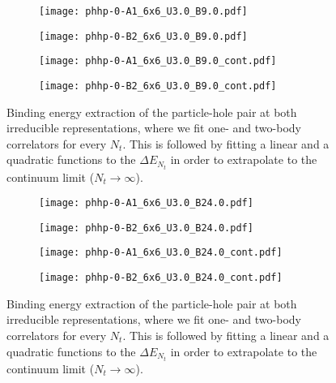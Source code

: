 \begin{figure}
  \begin{subfigure}{.5\textwidth}
    \centering
    \texttt{[image: phhp-0-A1\_6x6\_U3.0\_B9.0.pdf]}
  \end{subfigure}%
  \begin{subfigure}{.5\textwidth}
    \centering
    \texttt{[image: phhp-0-B2\_6x6\_U3.0\_B9.0.pdf]}
  \end{subfigure}
  \begin{subfigure}{.5\textwidth}
      \centering
      \texttt{[image: phhp-0-A1\_6x6\_U3.0\_B9.0\_cont.pdf]}
  \end{subfigure}
  \begin{subfigure}{.5\textwidth}
      \centering
      \texttt{[image: phhp-0-B2\_6x6\_U3.0\_B9.0\_cont.pdf]}
  \end{subfigure}
  \caption{Binding energy extraction of the particle-hole pair at both irreducible representations, where we fit one- and two-body correlators for every $N_t$. This is followed by fitting a linear and a quadratic functions to the $\Delta E_{N_t}$ in order to extrapolate to the continuum limit ($N_t\to\infty$).}
  \label{fig:fig11}
\end{figure}

\begin{figure}
  \begin{subfigure}{.5\textwidth}
    \centering
    \texttt{[image: phhp-0-A1\_6x6\_U3.0\_B24.0.pdf]}
  \end{subfigure}%
  \begin{subfigure}{.5\textwidth}
    \centering
    \texttt{[image: phhp-0-B2\_6x6\_U3.0\_B24.0.pdf]}
  \end{subfigure}
  \begin{subfigure}{.5\textwidth}
      \centering
      \texttt{[image: phhp-0-A1\_6x6\_U3.0\_B24.0\_cont.pdf]}
  \end{subfigure}
  \begin{subfigure}{.5\textwidth}
      \centering
      \texttt{[image: phhp-0-B2\_6x6\_U3.0\_B24.0\_cont.pdf]}
  \end{subfigure}
  \caption{Binding energy extraction of the particle-hole pair at both irreducible representations, where we fit one- and two-body correlators for every $N_t$. This is followed by fitting a linear and a quadratic functions to the $\Delta E_{N_t}$ in order to extrapolate to the continuum limit ($N_t\to\infty$).}
  \label{fig:fig12}
\end{figure}

